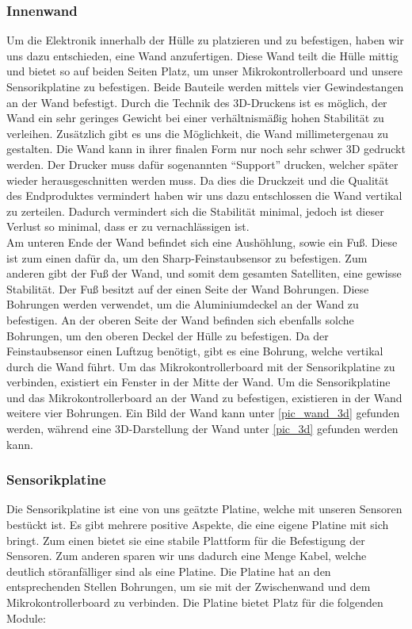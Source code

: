 \subsubsection{Innenwand}
Um die Elektronik innerhalb der Hülle zu platzieren und zu befestigen, haben wir uns dazu entschieden, eine Wand anzufertigen. Diese Wand teilt die Hülle mittig und bietet so auf beiden Seiten Platz, um unser Mikrokontrollerboard und unsere Sensorikplatine zu befestigen. Beide Bauteile werden mittels vier Gewindestangen an der Wand befestigt. Durch die Technik des 3D-Druckens ist es möglich, der Wand ein sehr geringes Gewicht bei einer verhältnismäßig hohen Stabilität zu verleihen. Zusätzlich gibt es uns die Möglichkeit, die Wand millimetergenau zu gestalten. Die Wand kann in ihrer finalen Form nur noch sehr schwer 3D gedruckt werden. Der Drucker muss dafür sogenannten ``Support'' drucken, welcher später wieder herausgeschnitten werden muss. Da dies die Druckzeit und die Qualität des Endproduktes vermindert haben wir uns dazu entschlossen die Wand vertikal zu zerteilen. Dadurch vermindert sich die Stabilität minimal, jedoch ist dieser Verlust so minimal, dass er zu vernachlässigen ist.\\

Am unteren Ende der Wand befindet sich eine Aushöhlung, sowie ein Fuß. Diese ist zum einen dafür da, um den Sharp-Feinstaubsensor zu befestigen. Zum anderen gibt der Fuß der Wand, und somit dem gesamten Satelliten, eine gewisse Stabilität. Der Fuß besitzt auf der einen Seite der Wand Bohrungen. Diese Bohrungen werden verwendet, um die Aluminiumdeckel an der Wand zu befestigen. An der oberen Seite der Wand befinden sich ebenfalls solche Bohrungen, um den oberen Deckel der Hülle zu befestigen. Da der Feinstaubsensor einen Luftzug benötigt, gibt es eine Bohrung, welche vertikal durch die Wand führt. Um das Mikrokontrollerboard mit der Sensorikplatine zu verbinden, existiert ein Fenster in der Mitte der Wand. Um die Sensorikplatine und das Mikrokontrollerboard an der Wand zu befestigen, existieren in der Wand weitere vier Bohrungen. Ein Bild der Wand kann unter \ref{pic_wand_3d} gefunden werden, während eine 3D-Darstellung der Wand unter \ref{pic_3d} gefunden werden kann.

\subsubsection{Sensorikplatine}
Die Sensorikplatine ist eine von uns geätzte Platine, welche mit unseren Sensoren bestückt ist. Es gibt mehrere positive Aspekte, die eine eigene Platine mit sich bringt. Zum einen bietet sie eine stabile Plattform für die Befestigung der Sensoren. Zum anderen sparen wir uns dadurch eine Menge Kabel, welche deutlich störanfälliger sind als eine Platine. Die Platine hat an den entsprechenden Stellen Bohrungen, um sie mit der Zwischenwand und dem Mikrokontrollerboard zu verbinden. Die Platine bietet Platz für die folgenden Module:

